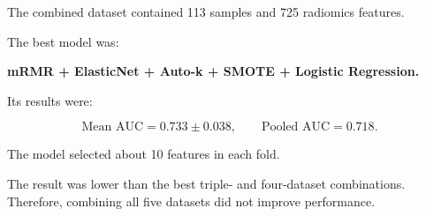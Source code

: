 \documentclass[10pt,a4paper]{article}
\begin{document}
The combined dataset contained 113 samples and 725 radiomics features.

The best model was:

\begin{center}
\textbf{mRMR + ElasticNet + Auto-k
+ SMOTE + Logistic Regression.}
\end{center}

Its results were:

\[
\text{Mean AUC}=0.733\pm0.038,
\qquad
\text{Pooled AUC}=0.718.
\]

The model selected about 10 features in each fold.

The result was lower than the best triple- and four-dataset combinations. Therefore, combining all five datasets did not improve performance. 
\end{document}
